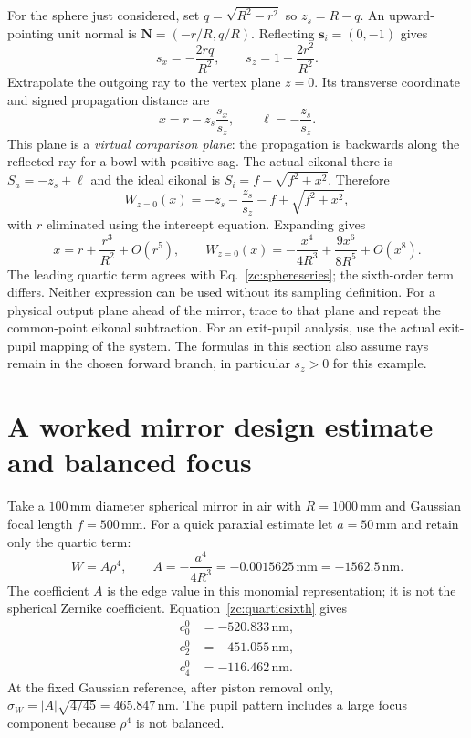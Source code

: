 For the sphere just considered, set $q=\sqrt{R^2-r^2}$ so $z_s=R-q$.
An upward-pointing unit normal is $\bm N=(-r/R,q/R)$. Reflecting
$\bm s_i=(0,-1)$ gives
\begin{equation}
 s_x=-\frac{2rq}{R^2},\qquad s_z=1-\frac{2r^2}{R^2}.
\end{equation}
Extrapolate the outgoing ray to the vertex plane $z=0$. Its transverse
coordinate and signed propagation distance are
\begin{equation}
 x=r-z_s\frac{s_x}{s_z},\qquad
 \ell=-\frac{z_s}{s_z}.
\end{equation}
This plane is a \emph{virtual comparison plane}: the propagation is
backwards along the reflected ray for a bowl with positive sag.
The actual eikonal there is $S_a=-z_s+\ell$ and the ideal eikonal is
$S_i=f-\sqrt{f^2+x^2}$. Therefore
\begin{equation}
 W_{z=0}(x)=-z_s-\frac{z_s}{s_z}-f+\sqrt{f^2+x^2},
 \label{zc:vertexplaneexact}
\end{equation}
with $r$ eliminated using the intercept equation. Expanding gives
\begin{equation}
 x=r+\frac{r^3}{R^2}+O(r^5),\qquad
 \boxed{W_{z=0}(x)=-\frac{x^4}{4R^3}
                       +\frac{9x^6}{8R^5}+O(x^8).}
 \label{zc:vertexplaneseries}
\end{equation}
The leading quartic term agrees with Eq.~\eqref{zc:sphereseries}; the
sixth-order term differs. Neither expression can be used without its
sampling definition. For a physical output plane ahead of the mirror,
trace to that plane and repeat the common-point eikonal subtraction.
For an exit-pupil analysis, use the actual exit-pupil mapping of the
system. The formulas in this section also assume rays remain in the
chosen forward branch, in particular $s_z>0$ for this example.

\section{A worked mirror design estimate and balanced focus}
Take a $100\,\mathrm{mm}$ diameter spherical mirror in air with
$R=1000\,\mathrm{mm}$ and Gaussian focal length $f=500\,\mathrm{mm}$.
For a quick paraxial estimate let $a=50\,\mathrm{mm}$ and retain only
the quartic term:
\begin{equation}
 W=A\rho^4,\qquad A=-\frac{a^4}{4R^3}
       =-0.0015625\,\mathrm{mm}=-1562.5\,\mathrm{nm}.
\end{equation}
The coefficient $A$ is the edge value in this monomial representation;
it is not the spherical Zernike coefficient. Equation~\eqref{zc:quarticsixth}
gives
\begin{align}
 c_0^0&=-520.833\,\mathrm{nm},\\
 c_2^0&=-451.055\,\mathrm{nm},\\
 c_4^0&=-116.462\,\mathrm{nm}.
\end{align}
At the fixed Gaussian reference, after piston removal only,
$\sigma_W=|A|\sqrt{4/45}=465.847\,\mathrm{nm}$. The pupil pattern
includes a large focus component because $\rho^4$ is not balanced.

